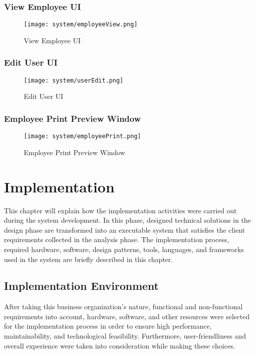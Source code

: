 \documentclass[12pt]{report}
\begin{document}
\subsection{View Employee UI}
\begin{figure}[H]
	\centering
	\texttt{[image: system/employeeView.png]}
	\caption{View Employee UI}
\end{figure}

\subsection{Edit User UI}
\begin{figure}[H]
	\centering
	\texttt{[image: system/userEdit.png]}
	\caption{Edit User UI}
\end{figure}

\subsection{Employee Print Preview Window}
\begin{figure}[H]
	\centering
	\texttt{[image: system/employeePrint.png]}
	\caption{Employee Print Preview Window}
\end{figure}

\newpage
\chapter{Implementation}
This chapter will explain how the implementation activities were carried out during the system development. In this phase, designed technical solutions in the design phase are transformed into an executable system that satisfies the client requirements collected in the analysis phase. The implementation process, required hardware, software, design patterns, tools, languages, and frameworks used in the system are briefly described in this chapter.

\section{Implementation Environment}
After taking this business organization's nature, functional and non-functional requirements into account, hardware, software, and other resources were selected for the implementation process in order to ensure high performance, maintainability, and technological feasibility. Furthermore, user-friendliness and overall experience were taken into consideration while making these choices.
\end{document}
